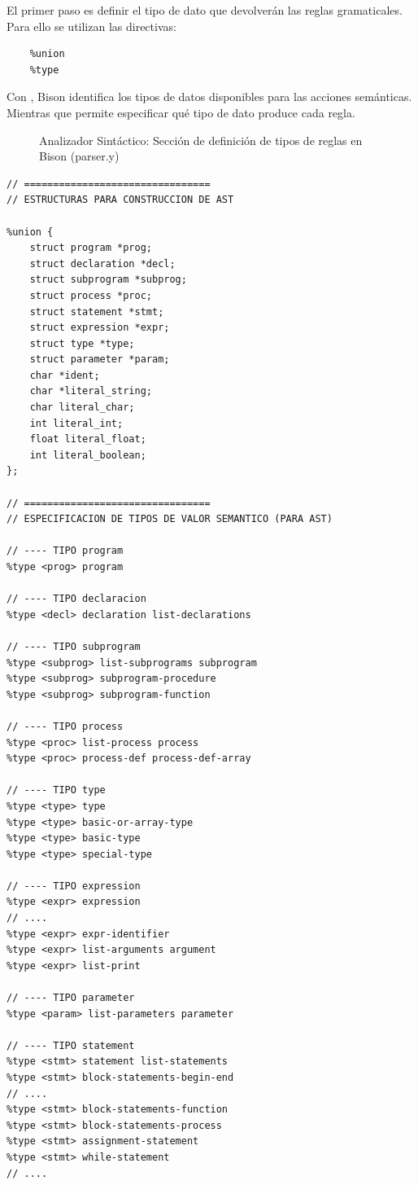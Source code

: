 El primer paso es definir el tipo de dato que devolverán las reglas gramaticales. Para ello se utilizan las directivas:
\begin{verbatim}
    %union
    %type
\end{verbatim}


Con , Bison identifica los tipos de datos disponibles para las acciones semánticas. Mientras que  permite especificar qué tipo de dato produce cada regla.

\newpage
\begin{figure}[h]
\caption{Analizador Sintáctico: Sección de definición de tipos de reglas en Bison (parser.y)}
\label{fig:bisonASTuniontype}
\end{figure}
\begin{lstlisting}[style=customflex]
// ================================
// ESTRUCTURAS PARA CONSTRUCCION DE AST

%union {
    struct program *prog;
    struct declaration *decl;
    struct subprogram *subprog;
    struct process *proc;
    struct statement *stmt;
    struct expression *expr;
    struct type *type;
    struct parameter *param;
    char *ident;
    char *literal_string;
    char literal_char;
    int literal_int;
    float literal_float;
    int literal_boolean;
};

// ================================
// ESPECIFICACION DE TIPOS DE VALOR SEMANTICO (PARA AST)

// ---- TIPO program
%type <prog> program

// ---- TIPO declaracion
%type <decl> declaration list-declarations

// ---- TIPO subprogram
%type <subprog> list-subprograms subprogram
%type <subprog> subprogram-procedure
%type <subprog> subprogram-function

// ---- TIPO process
%type <proc> list-process process 
%type <proc> process-def process-def-array

// ---- TIPO type
%type <type> type
%type <type> basic-or-array-type
%type <type> basic-type
%type <type> special-type

// ---- TIPO expression
%type <expr> expression 
// ....
%type <expr> expr-identifier
%type <expr> list-arguments argument
%type <expr> list-print

// ---- TIPO parameter
%type <param> list-parameters parameter

// ---- TIPO statement
%type <stmt> statement list-statements
%type <stmt> block-statements-begin-end
// ....
%type <stmt> block-statements-function
%type <stmt> block-statements-process
%type <stmt> assignment-statement 
%type <stmt> while-statement 
// ....
\end{lstlisting}



